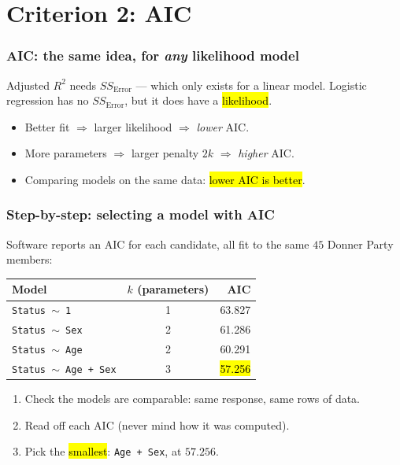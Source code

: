 \documentclass[slidestop,compress,mathserif]{beamer}
\begin{document}
\section{Criterion 2: AIC}
\begin{frame}
\frametitle{AIC: the same idea, for \emph{any} likelihood model}

Adjusted $R^2$ needs $SS_{\text{Error}}$ --- which only exists for a linear model. Logistic regression has no $SS_{\text{Error}}$, but it does have a \hl{likelihood}.


\begin{itemize}
\item Better fit $\Rightarrow$ larger likelihood $\Rightarrow$ \emph{lower} AIC.
\item More parameters $\Rightarrow$ larger penalty $2k$ $\Rightarrow$ \emph{higher} AIC.
\item Comparing models on the same data: \hl{lower AIC is better}.
\end{itemize}

\end{frame}
\begin{frame}
\frametitle{Step-by-step: selecting a model with AIC}

Software reports an AIC for each candidate, all fit to the same $45$ Donner Party members:

{\footnotesize
\begin{center}
\begin{tabular}{lcr}
\toprule
Model & $k$ (parameters) & AIC \\
\midrule
\texttt{Status $\sim$ 1}          & 1 & 63.827 \\
\texttt{Status $\sim$ Sex}        & 2 & 61.286 \\
\texttt{Status $\sim$ Age}        & 2 & 60.291 \\
\texttt{Status $\sim$ Age + Sex}  & 3 & \hl{57.256} \\
\bottomrule
\end{tabular}
\end{center}}

\vspace{-0.3em}
{\small
\begin{enumerate}
\item Check the models are comparable: same response, same rows of data.
\pause
\item Read off each AIC (never mind how it was computed).
\pause
\item Pick the \hl{smallest}: \texttt{Age + Sex}, at $57.256$.
\end{enumerate}}

\end{frame}
\end{document}
